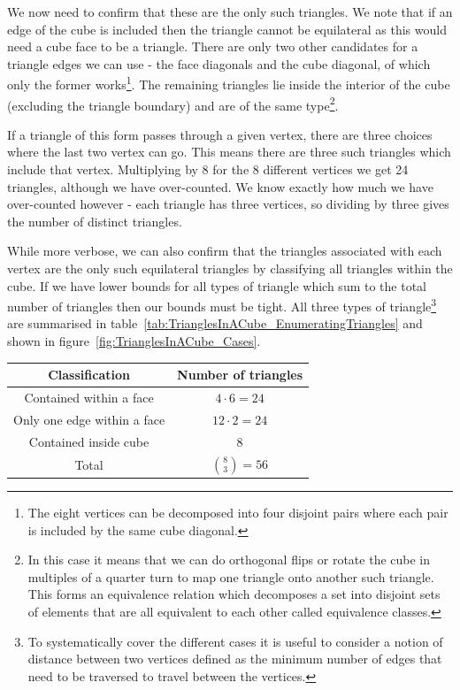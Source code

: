 \begin{solution}
	We now need to confirm that these are the only such triangles. We note that if an edge of the cube is included then the triangle cannot be equilateral as this would need a cube face to be a triangle. There are only two other candidates for a triangle edges we can use - the face diagonals and the cube diagonal, of which only the former works\footnote{The eight vertices can be decomposed into four disjoint pairs where each pair is included by the same cube diagonal.}. The remaining triangles lie inside the interior of the cube (excluding the triangle boundary) and are of the same type\footnote{In this case it means that we can do orthogonal flips or rotate the cube in multiples of a quarter turn to map one triangle onto another such triangle. This forms an equivalence relation which decomposes a set into disjoint sets of elements that are all equivalent to each other called equivalence classes.}.
	
	If a triangle of this form passes through a given vertex, there are three choices where the last two vertex can go. This means there are three such triangles which include that vertex. Multiplying by 8 for the 8 different vertices we get 24 triangles, although we have over-counted. We know exactly how much we have over-counted however - each triangle has three vertices, so dividing by three gives the number of distinct triangles.
	
	While more verbose, we can also confirm that the triangles associated with each vertex are the only such equilateral triangles by classifying all triangles within the cube. If we have lower bounds for all types of triangle which sum to the total number of triangles then our bounds must be tight. All three types of triangle\footnote{To systematically cover the different cases it is useful to consider a notion of distance between two vertices defined as the minimum number of edges that need to be traversed to travel between the vertices.} are summarised in table~\ref{tab:TrianglesInACube_EnumeratingTriangles} and shown in figure~\ref{fig:TrianglesInACube_Cases}.
	
	\begin{minipage}{\linewidth}
		\centering
		\label{tab:TrianglesInACube_EnumeratingTriangles}
		\begin{tabular}{cc}
			\toprule
			Classification & Number of triangles \\
			\midrule
			Contained within a face & $4 \cdot 6 = 24$ \\
			Only one edge within a face & $12 \cdot 2 = 24$ \\
			Contained inside cube & $8$ \\
			\midrule
			Total & ${{8}\choose{3}} = 56$ \\
			\bottomrule
		\end{tabular}
	\end{minipage}
	

\end{solution}
